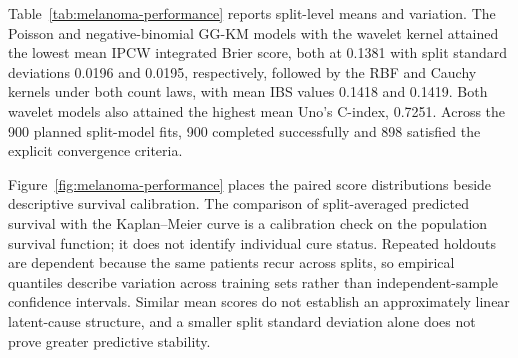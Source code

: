 
Table~\ref{tab:melanoma-performance} reports split-level means and
variation. The Poisson and negative-binomial GG-KM models with the wavelet
kernel attained the lowest mean IPCW integrated Brier score, both at
0.1381 with split standard deviations 0.0196 and 0.0195, respectively,
followed by the RBF and Cauchy kernels under both count laws, with mean
IBS values 0.1418 and 0.1419. Both wavelet models also attained the highest
mean Uno's C-index, 0.7251. Across the 900 planned split-model fits,
900 completed successfully and 898 satisfied the explicit convergence
criteria.

Figure~\ref{fig:melanoma-performance} places the paired score
distributions beside descriptive survival calibration. The comparison of
split-averaged predicted survival with the Kaplan--Meier curve is a
calibration check on the population survival function; it does not
identify individual cure status. Repeated holdouts are dependent because
the same patients recur across splits, so empirical quantiles describe
variation across training sets rather than independent-sample confidence
intervals. Similar mean scores do not establish an approximately linear
latent-cause structure, and a smaller split standard deviation alone does
not prove greater predictive stability.

